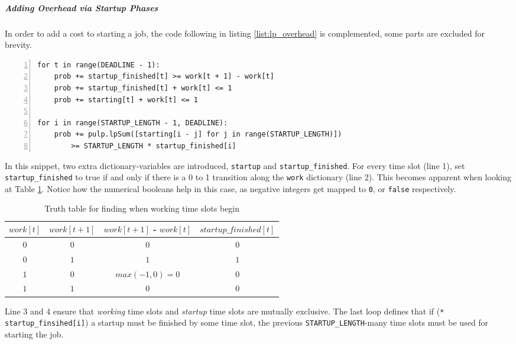 \subparagraph{Adding Overhead via Startup Phases}

In order to add a cost to starting a job, the code following in listing \ref{list:lp_overhead} is complemented, some parts are excluded for brevity.

\begin{minipage}{\linewidth} %
\begin{lstlisting}[frame=single, numbers=left, caption={LP Implementation for overhead}, label={list:lp_overhead}, basicstyle=\ttfamily]
for t in range(DEADLINE - 1):
    prob += startup_finished[t] >= work[t + 1] - work[t]
    prob += startup_finished[t] + work[t] <= 1
    prob += starting[t] + work[t] <= 1

for i in range(STARTUP_LENGTH - 1, DEADLINE):
    prob += pulp.lpSum([starting[i - j] for j in range(STARTUP_LENGTH)]) 
        >= STARTUP_LENGTH * startup_finished[i]
\end{lstlisting}
\end{minipage}


In this snippet, two extra dictionary-variables are introduced, \verb|startup| and \verb|startup_finished|.
For every time slot (line 1), set \verb|startup_finished| to true if and only if there is a 0 to 1 transition along the \verb|work| dictionary (line 2). This becomes apparent when looking at Table \ref{tab:truth_table_startup_finished}.
Notice how the numerical booleans help in this case, as negative integers get mapped to \verb|0|, or \verb|false| respectively.

\begin{table}[h!]
\centering
\begin{tabular}{|c|c|c|c|}
\hline
    $work[t]$ & $work[t+1]$ & $work[t+1]$ - $work[t]$ & $startup\_finished[t]$ \\ \hline
    $0$ & $0$ & $0$ & $0$ \\ \hline
    $0$ & $1$ & $1$ & $1$ \\ \hline
    $1$ & $0$ & $max(-1, 0) = 0$ & $0$ \\ \hline
    $1$ & $1$ & $0$ & $0$ \\ \hline
\end{tabular}
\caption{Truth table for finding when working time slots begin}
\label{tab:truth_table_startup_finished}
\end{table}

Line 3 and 4 ensure that \emph{working} time slots and \emph{startup} time slots are mutually exclusive.
The last loop defines that if (\verb|* startup_finsihed[i]|) a startup must be finished by some time slot, the previous \verb|STARTUP_LENGTH|-many time slots must be used for starting the job.

